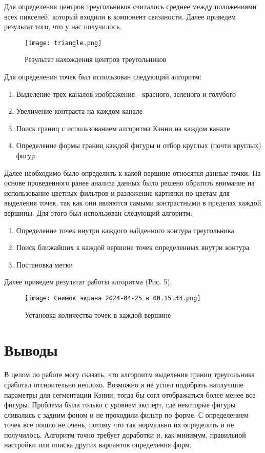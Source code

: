 \documentclass{article}
\begin{document}
Для определения центров треугольников считалось среднее между положениями всех пикселей, который входили в компонент связаности. Далее приведем результат того, что у нас получилось.

\begin{figure}
    \centering
    \texttt{[image: triangle.png]}
    \caption{Результат нахождения центров треугольников}
    \label{fig:enter-label}
\end{figure}

Для определения точек был использован следующий алгоритм:

\begin{enumerate}
    \item Выделение трех каналов изображения - красного, зеленого и голубого
    \item Увеличение контраста на каждом канале
    \item Поиск границ с использованием алгоритма Кэнни на каждом канале
    \item Определение формы границ каждой фигуры и отбор круглых (почти круглых) фигур
\end{enumerate}

Далее необходимо было определить к какой вершине относятся данные точки. На основе проведенного ранее анализа данных было решено обратить внимание на использование цветных фильтров и разложение картинки по цветам для выделения точек, так как они являются самыми контрастными в пределах каждой вершины. Для этого был использован следующий алгоритм. 

\begin{enumerate}
    \item Определение точек внутри каждого найденного контура треугольника
    \item Поиск ближайших к каждой вершине точек определенных внутри контура
    \item Постановка метки
\end{enumerate}

Далее приведем результат работы алгоритма (Рис. 5).

\begin{figure}
    \centering
    \texttt{[image: Снимок экрана 2024-04-25 в 00.15.33.png]}
    \caption{Установка количества точек в каждой вершине}
    \label{fig:enter-label}
\end{figure}

\section{Выводы}
В целом по работе могу сказать, что алгороитм выделения границ треугольника сработал отсноительно неплохо. Возможно я не успел подобрать наилучшие параметры для сегментации Кэнни, тогда бы согл отображаться более менее все фигуры. Проблема была только с уровнем эксперт, где некоторые фигуры сливались с задним фоном и не проходили фильтр по форме. С определением точек все пошло не очень, потому что так нормально их определить и не получилось. Алгоритм точно требует доработки и, как минимум, правильной настройки или поиска других вариантов определения форм.
\end{document}

